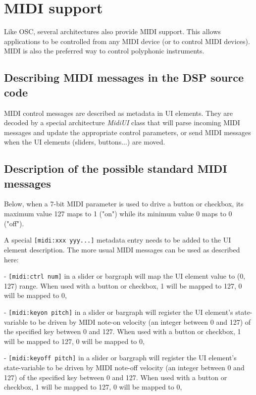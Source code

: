\chapter{MIDI support} 
\label{midi}

Like OSC, several \faust architectures also provide MIDI support. This allows \faust applications to be controlled from any MIDI device (or to control MIDI devices). MIDI is also the preferred way to control polyphonic instruments.

\section{Describing MIDI messages in the DSP source code}

MIDI control messages are described as metadata in UI elements. They are decoded by a special architecture \emph{MidiUI} class that will parse incoming MIDI messages and update the appropriate control parameters, or send MIDI messages when the UI elements (sliders, buttons...) are moved.

\section{Description of the possible standard MIDI messages}

Below, when a 7-bit MIDI parameter is used to drive a button or
checkbox, its maximum value 127 maps to 1 ("on") while its minimum
value 0 maps to 0 ("off").

A special \lstinline'[midi:xxx yyy...]' metadata entry needs to be added to the UI element description. The more usual MIDI messages can be used as described here:

- \lstinline'[midi:ctrl num]' in a slider or bargraph will map the UI element value to (0, 127) range. When used with a button or checkbox, 1 will be mapped to 127, 0 will be mapped to 0,

- \lstinline'[midi:keyon pitch]' in a slider or bargraph will register the UI element's state-variable to be driven by MIDI note-on velocity (an integer between 0 and 127) of the specified key between 0 and 127. When used with a button or checkbox, 1 will be mapped to 127, 0 will be mapped to 0,

- \lstinline'[midi:keyoff pitch]' in a slider or bargraph will register the UI element's state-variable to be driven by MIDI note-off velocity (an integer between 0 and 127) of the specified key between 0 and 127. When used with a button or checkbox, 1 will be mapped to 127, 0 will be mapped to 0,

